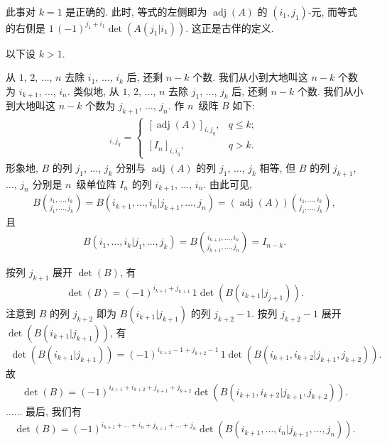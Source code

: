 此事对 \(k = 1\) 是正确的.
此时, 等式的左侧即为 \(\operatorname{adj} {(A)}\)
的 \((i_1, j_1)\)-元,
而等式的右侧是
\(1 \, (-1)^{j_1 + i_1} \det {(A(j_1|i_1))}\).
这正是古伴的定义.

以下设 \(k > 1\).

从 \(1\), \(2\), \(\dots\), \(n\)
去除 \(i_1\), \(\dots\), \(i_k\) 后,
还剩 \(n - k\) 个数.
我们从小到大地叫这 \(n - k\) 个数为
\(i_{k+1}\), \(\dots\), \(i_n\).
类似地, 从 \(1\), \(2\), \(\dots\), \(n\)
去除 \(j_1\), \(\dots\), \(j_k\) 后,
还剩 \(n - k\) 个数.
我们从小到大地叫这 \(n - k\) 个数为
\(j_{k+1}\), \(\dots\), \(j_n\).
作 \(n\)~级阵 \(B\) 如下:
\begin{align*}
    [B]_{i,j_q}
    = \begin{cases}
          [\operatorname{adj} {(A)}]_{i,j_q},
           & q \leq k; \\
          [I_n]_{i,i_q},
           & q > k.
      \end{cases}
\end{align*}
形象地, \(B\) 的列 \(j_1\), \(\dots\), \(j_k\)
分别与 \(\operatorname{adj} {(A)}\) 的列 \(j_1\), \(\dots\), \(j_k\)
相等,
但 \(B\) 的列 \(j_{k+1}\), \(\dots\), \(j_n\)
分别是 \(n\)~级单位阵 \(I_n\) 的列 \(i_{k+1}\), \(\dots\), \(i_n\).
由此可见,
\begin{align*}
    B\binom{i_1,\dots,i_k}{j_1,\dots,j_k}
    = B({i_{k+1},\dots,i_n}|{j_{k+1},\dots,j_n})
    = (\operatorname{adj} {(A)})
    \binom{i_1,\dots,i_k}{j_1,\dots,j_k},
\end{align*}
且
\begin{align*}
    B({i_1,\dots,i_k}|{j_1,\dots,j_k})
    = B\binom{i_{k+1},\dots,i_n}{j_{k+1},\dots,j_n}
    = I_{n-k}.
\end{align*}

按列 \(j_{k+1}\) 展开 \(\det {(B)}\), 有
\begin{align*}
    \det {(B)} = (-1)^{i_{k+1}+j_{k+1}} \, 1
    \det {(B(i_{k+1}|j_{j+1}))}.
\end{align*}
注意到 \(B\) 的列 \(j_{k+2}\) 即为
\(B(i_{k+1}|j_{k+1})\) 的列 \(j_{k+2}-1\).
按列 \(j_{k+2}-1\) 展开 \(\det {(B(i_{k+1}|j_{k+1}))}\),
有
\begin{align*}
    \det {(B(i_{k+1}|j_{k+1}))} = (-1)^{i_{k+2}-1+j_{k+2}-1} \, 1
    \det {(B({i_{k+1},i_{k+2}}|{j_{k+1},j_{k+2}}))}.
\end{align*}
故
\begin{align*}
    \det {(B)} = (-1)^{i_{k+1}+i_{k+2}+j_{k+1}+j_{k+2}}
    \det {(B({i_{k+1},i_{k+2}}|{j_{k+1},j_{k+2}}))}.
\end{align*}
\(\dots \dots\)
最后, 我们有
\begin{align*}
    \det {(B)}
    = (-1)^{i_{k+1}+\dots+i_n+j_{k+1}+\dots+j_n}
    \det {(B({i_{k+1},\dots,i_n}|{j_{k+1},\dots,j_n}))}.
\end{align*}

